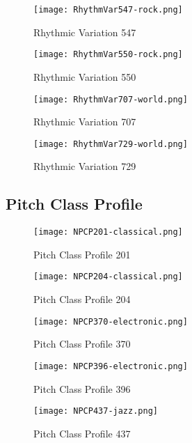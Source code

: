 \documentclass{article} %
\begin{document}
\begin{figure}[H]
\centering
\texttt{[image: RhythmVar547-rock.png]}
\caption{Rhythmic Variation 547}
\label{fig:rhythmVar547_1}
\end{figure}

\begin{figure}[H]
\centering
\texttt{[image: RhythmVar550-rock.png]}
\caption{Rhythmic Variation 550}
\label{fig:rhythmVar550_1}
\end{figure}

\begin{figure}[H]
\centering
\texttt{[image: RhythmVar707-world.png]}
\caption{Rhythmic Variation 707}
\label{fig:rhythmVar707_1}
\end{figure}

\begin{figure}[H]
\centering
\texttt{[image: RhythmVar729-world.png]}
\caption{Rhythmic Variation 729}
\label{fig:rhythmVar729_1}
\end{figure}
\clearpage

\subsection{Pitch Class Profile}
\label{sec:PCP}

\begin{figure}[H]
\centering
\texttt{[image: NPCP201-classical.png]}
\caption{Pitch Class Profile 201}
\label{fig:NPCP201_1}
\end{figure}

\begin{figure}[H]
\centering
\texttt{[image: NPCP204-classical.png]}
\caption{Pitch Class Profile 204}
\label{fig:NPCP204_1}
\end{figure}


\begin{figure}[H]
\centering
\texttt{[image: NPCP370-electronic.png]}
\caption{Pitch Class Profile 370}
\label{fig:NPCP370_1}
\end{figure}

\begin{figure}[H]
\centering
\texttt{[image: NPCP396-electronic.png]}
\caption{Pitch Class Profile 396}
\label{fig:NPCP396_1}
\end{figure}

\begin{figure}[H]
\centering
\texttt{[image: NPCP437-jazz.png]}
\caption{Pitch Class Profile 437}
\label{fig:NPCP437_1}
\end{figure}
\end{document}
